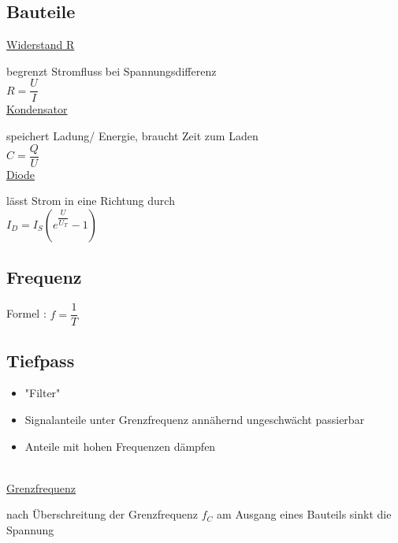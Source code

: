 \documentclass[paper=a4, fontsize=11pt]{scrartcl}
\numberwithin{equation}{section}
\numberwithin{figure}{section}
\numberwithin{table}{section}
\begin{document}

\subsection{Bauteile}

\underline{Widerstand R}

begrenzt Stromfluss bei Spannungsdifferenz \\

$R= \dfrac{U}{I}$ \\

\underline{Kondensator}

speichert Ladung/ Energie, braucht Zeit zum Laden\\

$C= \dfrac{Q}{U}$ \\

\underline{Diode}

lässt Strom in eine Richtung durch \\

$I_{D}= I_{S} (e^{ \dfrac{U}{U_{T}}} - 1)$ \\


\subsection{Frequenz}

Formel : $f = \dfrac{1}{T}$ \\


\subsection{Tiefpass}

\begin{itemize}
\item "Filter"
\item Signalanteile unter Grenzfrequenz annähernd ungeschwächt passierbar
\item Anteile mit hohen Frequenzen dämpfen
\end{itemize}
\\

\underline{Grenzfrequenz}

nach Überschreitung der Grenzfrequenz $f_{C}$ am Ausgang eines Bauteils sinkt die Spannung \\
\end{document}
